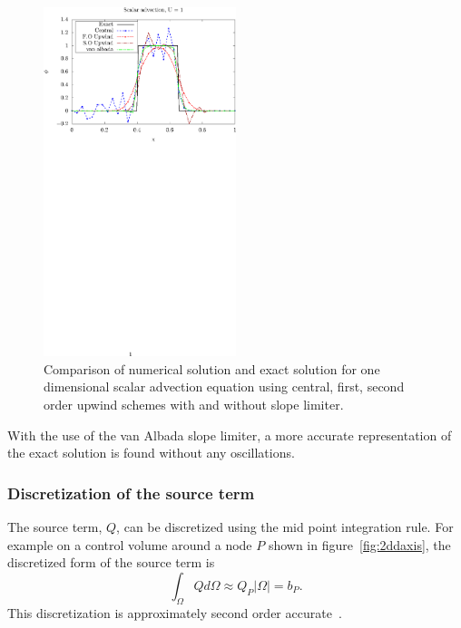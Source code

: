 \begin{figure}[h]
\centering
\captionsetup{justification=centering}
 \includegraphics[trim=0 395 0 0,clip, width=0.5\textwidth]{ch2_litsurvey/Figures/box_cen_fososl.eps}
\caption{Comparison of numerical solution and exact solution for one dimensional scalar advection equation using central, first, second order upwind schemes with and without slope limiter.}
 \label{fig:slopelim}
\end{figure}
With the use of the van Albada slope limiter, a more accurate representation of the exact solution is found without any oscillations.
\subsubsection{Discretization of the source term}
The source term, $Q$, can be discretized using the mid point integration rule. For example on a control volume around a node $P$ shown in figure~\ref{fig:2ddaxis}, the discretized form of the source term is
\begin{equation}
\int_{\Omega} Q d\Omega \approx Q_P |\Omega| = b_P.
\end{equation}
This discretization is approximately second order accurate~\cite{Ferziger2002}.

